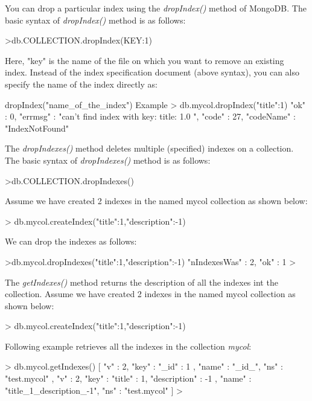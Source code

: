 \documentclass[12pt]{article}
\begin{document}
\begin{bashcode}
\begin{bashcode}
You can drop a particular index using the \emph{dropIndex()} method of
MongoDB. The basic syntax of \emph{dropIndex()} method is as follows:
\begin{bashcode}
>db.COLLECTION.dropIndex({KEY:1})
\end{bashcode}
Here, "key" is the name of the file on which you want to remove an
existing index. Instead of the index specification document (above
syntax), you can also specify the name of the index directly as:

\begin{bashcode}
dropIndex("name_of_the_index")
Example
> db.mycol.dropIndex({"title":1})
{
    "ok" : 0,
    "errmsg" : "can't find index with key: { title: 1.0 }",
    "code" : 27,
    "codeName" : "IndexNotFound"
}
\end{bashcode}

The \emph{dropIndexes()} method deletes multiple (specified) indexes on a collection.
The basic syntax of \emph{dropIndexes()} method is as follows:

\begin{bashcode}
>db.COLLECTION.dropIndexes()
\end{bashcode}
Assume we have created 2 indexes in the named mycol collection as shown
below:
\begin{bashcode}
> db.mycol.createIndex({"title":1,"description":-1})
\end{bashcode}
We can drop the indexes as follows:

\begin{bashcode}
>db.mycol.dropIndexes({"title":1,"description":-1})
{ "nIndexesWas" : 2, "ok" : 1 }
>
\end{bashcode}

The \emph{getIndexes()} method returns the description of all the
indexes int the collection. Assume we have created 2 indexes in the
named mycol collection as shown below:

\begin{bashcode}
> db.mycol.createIndex({"title":1,"description":-1})
\end{bashcode}

Following example retrieves all the indexes in the collection
\emph{mycol}:

\begin{bashcode}
> db.mycol.getIndexes()
[
    {
        "v" : 2,
        "key" : {
            "_id" : 1
        },
        "name" : "_id_",
        "ns" : "test.mycol"
    },
    {
        "v" : 2,
        "key" : {
            "title" : 1,
            "description" : -1
        },
        "name" : "title_1_description_-1",
        "ns" : "test.mycol"
    }
]
>
\end{bashcode}


\end{bashcode}
\end{bashcode}
\end{document}
